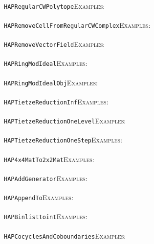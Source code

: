 \documentclass[a4paper,11pt]{report}
\begin{document}
{{ \\
 \texttt{HAPRegularCWPolytope}{\nobreakspace}{\nobreakspace}{\nobreakspace}{\nobreakspace}\textsc{Examples:} \\
 \\
 \texttt{HAPRemoveCellFromRegularCWComplex}{\nobreakspace}{\nobreakspace}{\nobreakspace}{\nobreakspace}\textsc{Examples:} \\
 \\
 \texttt{HAPRemoveVectorField}{\nobreakspace}{\nobreakspace}{\nobreakspace}{\nobreakspace}\textsc{Examples:} \\
 \\
 \texttt{HAPRingModIdeal}{\nobreakspace}{\nobreakspace}{\nobreakspace}{\nobreakspace}\textsc{Examples:} \\
 \\
 \texttt{HAPRingModIdealObj}{\nobreakspace}{\nobreakspace}{\nobreakspace}{\nobreakspace}\textsc{Examples:} \\
 \\
 \texttt{HAPTietzeReduction{\textunderscore}Inf}{\nobreakspace}{\nobreakspace}{\nobreakspace}{\nobreakspace}\textsc{Examples:} \\
 \\
 \texttt{HAPTietzeReduction{\textunderscore}OneLevel}{\nobreakspace}{\nobreakspace}{\nobreakspace}{\nobreakspace}\textsc{Examples:} \\
 \\
 \texttt{HAPTietzeReduction{\textunderscore}OneStep}{\nobreakspace}{\nobreakspace}{\nobreakspace}{\nobreakspace}\textsc{Examples:} \\
 \\
 \texttt{HAP{\textunderscore}4x4MatTo2x2Mat}{\nobreakspace}{\nobreakspace}{\nobreakspace}{\nobreakspace}\textsc{Examples:} \\
 \\
 \texttt{HAP{\textunderscore}AddGenerator}{\nobreakspace}{\nobreakspace}{\nobreakspace}{\nobreakspace}\textsc{Examples:} \\
 \\
 \texttt{HAP{\textunderscore}AppendTo}{\nobreakspace}{\nobreakspace}{\nobreakspace}{\nobreakspace}\textsc{Examples:} \\
 \\
 \texttt{HAP{\textunderscore}Binlisttoint}{\nobreakspace}{\nobreakspace}{\nobreakspace}{\nobreakspace}\textsc{Examples:} \\
 \\
 \texttt{HAP{\textunderscore}CocyclesAndCoboundaries}{\nobreakspace}{\nobreakspace}{\nobreakspace}{\nobreakspace}\textsc{Examples:} \\
}}
\end{document}
